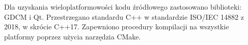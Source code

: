 \par
Dla uzyskania wieloplatformowości kodu źródłowego zastosowano biblioteki: GDCM i Qt.
Przestrzegano standardu C++ w standardzie ISO/IEC 14882 z 2018, w skrócie C++17.
Zapewniono procedury kompilacji na wszystkie platformy poprzez użycia narzędzia CMake.

